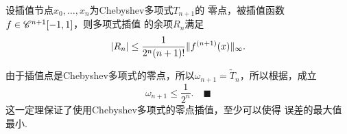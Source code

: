   \begin{thm}[Chebyshev零点插值]
    设插值节点$x_0,\dots,x_n$为Chebyshev多项式$T_{n+1}$的
    零点，被插值函数$\mathnormal{f}\in\mathscr{C}^{n+1}[-1, 1]$，则多项式插值
    的余项$R_n$满足
    \[
      |R_n| \le \frac{1}{2^n(n+1)!}\|\mathnormal{f}^{(n+1)}(x)\|_{\infty}.
    \]
  \end{thm}
  \proof
    由于插值点是Chebyshev多项式的零点，所以$\omega_{n+1}=
    \widetilde{T}_n$，所以根据，成立
    \[
      \omega_{n+1} \le \frac{1}{2^n}.\quad\blacksquare
    \]
  \remark
    这一定理保证了使用Chebyshev多项式的零点插值，至少可以使得
    误差的最大值最小.
